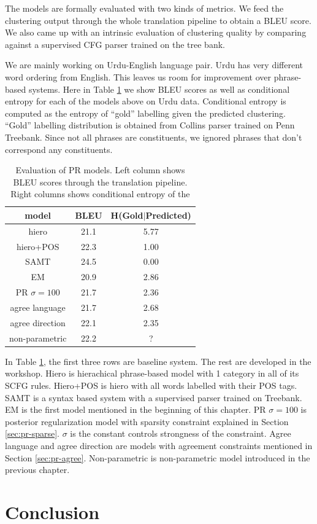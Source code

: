 The models are formally evaluated with two kinds
of metrics. We feed the clustering output
through the whole translation pipeline 
to obtain a BLEU score. We also came up 
with an intrinsic evaluation of clustering quality
by comparing against a supervised CFG parser trained on the
tree bank.

We are mainly working on Urdu-English language pair. 
Urdu has very 
different word ordering from English. 
This leaves us room for improvement over
phrase-based systems.
Here in Table \ref{tab:results} 
we show BLEU scores as well as
conditional entropy for each of the models above
on Urdu data. Conditional entropy is computed
as the entropy of ``gold'' labelling given
the predicted clustering. ``Gold'' labelling
distribution
is obtained from Collins parser
trained on Penn Treebank. Since not
all phrases are constituents, we ignored
phrases that don't correspond any constituents.

\begin{table}[h]
  \centering
  \begin{tabular}{ |*{3}{c|} }
    \hline
    model & BLEU & H(Gold$|$Predicted)\\
    \hline
    hiero & 21.1 & 5.77\\
    hiero+POS & 22.3 & 1.00 \\
    SAMT & 24.5 & 0.00 \\
    \hline
    EM & 20.9 & 2.86 \\
    PR $\sigma=100$ & 21.7 & 2.36 \\
    agree language & 21.7 & 2.68 \\
    agree direction & 22.1 & 2.35\\
    non-parametric & 22.2 & ?\\
    \hline
  \end{tabular}
    \caption
  {Evaluation of PR models.
	Left column shows BLEU scores
	through the translation pipeline.
	Right columns shows conditional entropy
	of the 
    }
  \label{tab:results}
\end{table}

In Table \ref{tab:results}, the first three rows
are baseline system. The rest are developed in the workshop.
Hiero is hierachical phrase-based
model with 1 category in all of its SCFG rules. Hiero+POS
is hiero with all words labelled with their POS tags.
SAMT is a syntax based system with a supervised
parser trained on Treebank. EM is the first model mentioned
in the beginning of this chapter. PR $\sigma=100$ is 
posterior regularization model with sparsity constraint
explained in Section \ref{sec:pr-sparse}.
$\sigma$ is the constant controls strongness of the constraint.
Agree language and agree direction are models with agreement 
constraints mentioned in Section \ref{sec:pr-agree}. Non-parametric
is non-parametric model introduced in the previous chapter.
\section{Conclusion}
